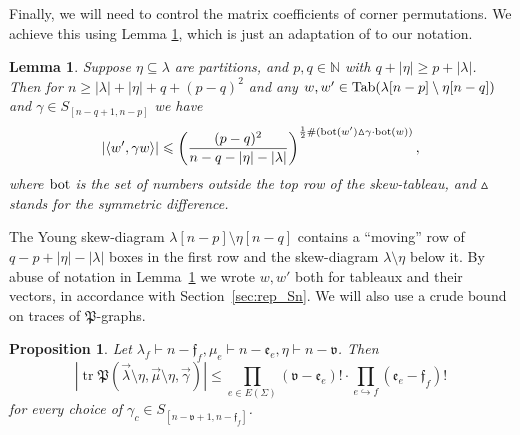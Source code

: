\documentclass{amsart}
\newtheorem{lemma}[conjecture]{Lemma}
\newtheorem{proposition}[conjecture]{Proposition}
\newcommand{\tn}{\textnormal}
\newcommand{\tr}{\operatorname{tr}}
\begin{document}
Finally, we will need to control the matrix coefficients of corner permutations. We achieve this using Lemma \ref{lmm:MP_skew_bd}, which is just an adaptation of \cite[Proposition 4.4]{asymptotic_stats_random_covering_surfaces_MageePuder23} to our notation.
\begin{lemma}\label{lmm:MP_skew_bd}
Suppose $\eta\subseteq\lambda$ are partitions, and $p,q\in\mathbb{N}$ with $q+|\eta|\geqslant p+|\lambda|$. Then for $n\geqslant |\lambda|+|\eta|+q+(p-q)^2$ and any $w,w'\in\tn{Tab}(\lambda[n-p]\setminus\eta[n-q])$ and $\gamma\in S_{[n-q+1,n-p]}$ we have
\begin{equation*}
|\langle w',\gamma w\rangle|\leqslant\left(\frac{(p-q)^2}{n-q-|\eta|-|\lambda|}\right)^{\frac{1}{2}\#(\tn{bot}(w')\vartriangle\gamma\cdot\tn{bot}(w))},
\end{equation*}
where $\tn{bot}$ is the set of numbers outside the top row of the skew-tableau, and $\vartriangle$ stands for the symmetric difference.
\end{lemma}
The Young skew-diagram $\lambda[n-p]\setminus\eta[n-q]$ contains a ``moving'' row of $q-p+|\eta|-|\lambda|$ boxes in the first row and the skew-diagram $\lambda\setminus\eta$ below it. By abuse of notation in Lemma~\ref{lmm:MP_skew_bd} we wrote $w,w'$ both for tableaux and their vectors, in accordance with Section~\ref{sec:rep_Sn}. We will also use a crude bound on traces of $\mathfrak{P}$-graphs.
\begin{proposition}\label{prop:univ_Pg_bd}
Let $\lambda_f\vdash n-\mathfrak{f}_f,\mu_e\vdash n-\mathfrak{e}_e,\eta\vdash n-\mathfrak{v}$. Then
\begin{equation*}
\left|\tr\mathfrak{P}(\vec\lambda\setminus\eta,\vec\mu\setminus\eta,\vec\gamma)\right|\leqslant\prod_{e\in E(\Sigma)}(\mathfrak{v}-\mathfrak{e}_e)!\cdot\prod_{e\hookrightarrow f}(\mathfrak{e}_e-\mathfrak{f}_f)!
\end{equation*}
for every choice of $\gamma_c\in S_{[n-\mathfrak{v}+1,n-\mathfrak{f}_f]}$.
\end{proposition}
\end{document}
